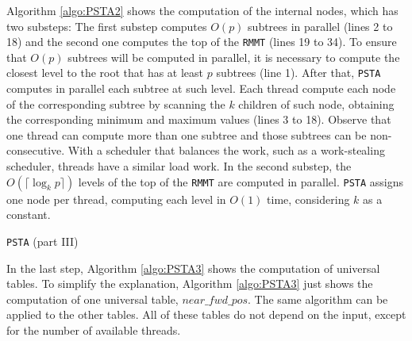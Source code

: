	Algorithm \ref{algo:PSTA2} shows the computation of the internal nodes, which has two substeps: The first substep computes $O(p)$ subtrees in parallel (lines 2 to 18) and the second one computes the top of the {\tt RMMT} (lines 19 to 34). To ensure that $O(p)$ subtrees will be computed in parallel, it is necessary to compute the closest level to the root that has at least $p$ subtrees (line 1). After that, {\tt PSTA} computes in parallel each subtree at such level. Each thread compute each node of the corresponding subtree by scanning the $k$ children of such node, obtaining the corresponding minimum and maximum values (lines 3 to 18). Observe that one thread can compute more than one subtree and those subtrees can be non-consecutive. With a scheduler that balances the work, such as a work-stealing scheduler, threads have a similar load work. In the second substep, the $O(\lceil \log_{k}p \rceil)$ levels of the top of the {\tt RMMT} are computed in parallel. {\tt PSTA} assigns one node per thread, computing each level in $O(1)$ time, considering $k$ as a constant.


\begin{algorithm}[t]
\small
\SetVlineSkip{-2cm}
  \LinesNumbered
  \SetAlgoNoEnd
  \DontPrintSemicolon
  \BlankLine%


  \caption{{\tt PSTA} (part III)}
  \label{algo:PSTA3}
\end{algorithm}
\normalsize

 In the last step, Algorithm \ref{algo:PSTA3} shows the computation of universal tables. To simplify the explanation, Algorithm \ref{algo:PSTA3} just shows the computation of one universal table, $near\_fwd\_pos$. The same algorithm can be applied to the other tables. All of these tables do not depend on the input, except for the number of available threads.
\newline

